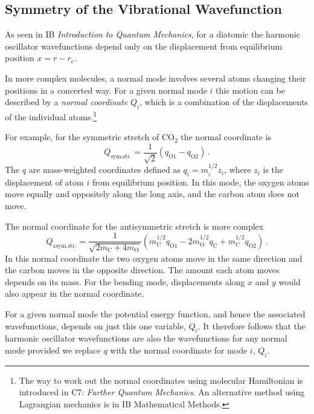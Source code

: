 \documentclass{article}
\theoremstyle{plain}\theoremheaderfont{\normalfont\itshape}\theorembodyfont{\rmfamily}\theoremseparator{.}\newtheorem*{rem}{Remark}\newtheorem*{ex}{Example}\newtheorem*{proof}{Proof}\newtheorem*{altp}{Alternative proof}
\theoremstyle{plain}\theoremheaderfont{\normalfont\bfseries}\theorembodyfont{\rmfamily}\theoremseparator{.}\newtheorem{thm}{Theorem}[section]\newtheorem{lem}[thm]{Lemma}\newtheorem{prop}[thm]{Proposition}\newtheorem*{cor}{Corollary}\newtheorem{defn}[thm]{Definition}\newtheorem{clm}[thm]{Claim}\newtheorem{clminproof}{Claim}\newtheorem{pos}{Postulate}[section]
\theoremstyle{break}\theoremheaderfont{\normalfont\itshape}\theorembodyfont{\rmfamily}\theoremseparator{.\medskip}\newtheorem*{proofskip}{Proof}\newtheorem*{exs}{Examples}\newtheorem*{rems}{Remarks}
\theoremstyle{break}\theoremheaderfont{\normalfont\bfseries}\theorembodyfont{\rmfamily}\theoremseparator{.\medskip}\newtheorem{lemskip}[thm]{Lemma}\newtheorem{defnskip}[thm]{Definition}\newtheorem{propskip}[thm]{Proposition}\newtheorem{thmskip}[thm]{Theorem}
\numberwithin{equation}{section}
\begin{document}
    \subsection{Symmetry of the Vibrational Wavefunction}
    As seen in IB \textit{Introduction to Quantum Mechanics}, for a diatomic the harmonic oscillator wavefunctions depend only on the displacement from equilibrium position \(x=r-r_e\).

    In more complex molecules, a normal mode involves several atoms changing their positions in a concerted way. For a given normal mode \(i\) this motion can be described by a \textit{normal coordinate} \(Q_i\), which is a combination of the displacements of the individual atoms.\footnote{The way to work out the normal coordinates using molecular Hamiltonian is introduced in C7: \textit{Further Quantum Mechanics}. An alternative method using Lagrangian mechanics is in IB Mathematical Methods.}

    For example, for the symmetric stretch of \(\mathrm{CO_2}\) the normal coordinate is
    \begin{equation}
        Q_{\text{sym.str.}}=\frac{1}{\sqrt{2}}(q_{\mathrm{O1}}-q_{\mathrm{O2}})\,.
    \end{equation}
    The \(q\) are mass-weighted coordinates defined as \(q_i=m_i^{1/2}z_i\), where \(z_i\) is the displacement of atom \(i\) from equilibrium position. In this mode, the oxygen atoms move equally and oppositely along the long axis, and the carbon atom does not move.

    The normal coordinate for the antisymmetric stretch is more complex
    \begin{equation}
        Q_{\text{asym.str.}}=\frac{1}{\sqrt{2m_{\mathrm{C}}+4m_{\mathrm{O}}}}\left(m_{\mathrm{C}}^{1/2}q_{\mathrm{O1}}-2m_{\mathrm{O}}^{1/2}q_{\mathrm{C}}+m_{\mathrm{C}}^{1/2}q_{\mathrm{O2}}\right)\,.
    \end{equation}
    In this normal coordinate the two oxygen atoms move in the same direction and the carbon moves in the opposite direction. The amount each atom moves depends on its mass. For the bending mode, displacements along \(x\) and \(y\) would also appear in the normal coordinate.

    For a given normal mode the potential energy function, and hence the associated wavefunctions, depends on just this one variable, \(Q_i\). It therefore follows that the harmonic oscillator wavefunctions are also the wavefunctions for any normal mode provided we replace \(q\) with the normal coordinate for mode \(i\), \(Q_i\).
    
\end{document}
